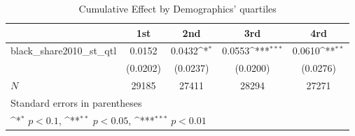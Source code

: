 \begin{table}[htbp]\centering
\def\sym#1{\ifmmode^{#1}\else\(^{#1}\)\fi}
\caption{Cumulative Effect by Demographics' quartiles}
\begin{tabular}{l*{4}{c}}
\hline\hline
            &\multicolumn{1}{c}{1st}&\multicolumn{1}{c}{2nd}&\multicolumn{1}{c}{3rd}&\multicolumn{1}{c}{4rd}\\
\hline
black\_share2010\_st\_qtl&      0.0152         &      0.0432\sym{*}  &      0.0553\sym{***}&      0.0610\sym{**} \\
            &    (0.0202)         &    (0.0237)         &    (0.0200)         &    (0.0276)         \\
\hline
\(N\)       &       29185         &       27411         &       28294         &       27271         \\
\hline\hline
\multicolumn{5}{l}{\footnotesize Standard errors in parentheses}\\
\multicolumn{5}{l}{\footnotesize \sym{*} \(p<0.1\), \sym{**} \(p<0.05\), \sym{***} \(p<0.01\)}\\
\end{tabular}
\end{table}
